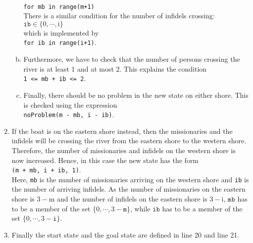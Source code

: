 \begin{enumerate}
\begin{enumerate}[(a)]
            \\[0.2cm]
            \hspace*{1.3cm}
            \texttt{for mb in range(m+1)}
            \\[0.2cm]
            There is a similar condition for the number of infidels crossing:
            \\[0.2cm]
            \hspace*{1.3cm}
            $\mathtt{ib} \in \{0,\cdots,\mathrm{i}\}$
            \\[0.2cm]
            which is implemented by
            \\[0.2cm]
            \hspace*{1.3cm}
            \texttt{for ib in range(i+1)}.
      \item Furthermore, we have to check that the number of persons crossing the river is at least 1
            and at most 2.  This explains the condition
            \\[0.2cm]
            \hspace*{1.3cm}
            \texttt{1 <= mb + ib <= 2}.
      \item Finally, there should be no problem in the new state on either shore.  This is checked
            using the expression
            \\[0.2cm]
            \hspace*{1.3cm}
            \texttt{noProblem(m - mb, i - ib)}.
      \end{enumerate}
\item If the boat is on the eastern shore instead, then the missionaries and the infidels will be crossing
      the river from the eastern shore to the western shore.  Therefore, the number of missionaries and
      infidels on the western shore is now increased.  Hence, in this case the new state has the form
      \\[0.2cm]
      \hspace*{1.3cm}
      \texttt{(m + mb, i + ib, 1)}.
      \\[0.2cm]
      Here, \texttt{mb} is the number of missionaries arriving on the western shore and \texttt{ib} is the
      number of arriving infidels.
      As the number of missionaries on the eastern shore is $3 - \mathrm{m}$ and the number of infidels on the
      eastern shore is $3 - \mathrm{i}$, $\texttt{mb}$ has to be a member of the set $\{0,\cdots,3 -\mathtt{m}\}$, while
      $\texttt{ib}$ has to be a member of the set $\{0,\cdots,3 - \mathtt{i}\}$.
\item Finally the start state and the goal state are defined in line 20 and line 21.
\end{enumerate}

